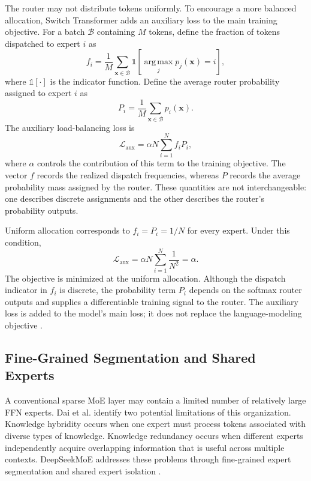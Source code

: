 The router may not distribute tokens uniformly. To encourage a more
balanced allocation, Switch Transformer adds an auxiliary loss to the
main training objective. For a batch \(\mathcal{B}\) containing \(M\)
tokens, define the fraction of tokens dispatched to expert \(i\) as
\begin{equation}
    f_i
    =
    \frac{1}{M}
    \sum_{\mathbf{x}\in\mathcal{B}}
    \mathbb{1}
    \left[
        \operatorname*{arg\,max}_{j}p_j(\mathbf{x})=i
    \right],
    \label{eq:switch-dispatch-fraction}
\end{equation}
where \(\mathbb{1}[\cdot]\) is the indicator function. Define the
average router probability assigned to expert \(i\) as
\begin{equation}
    P_i
    =
    \frac{1}{M}
    \sum_{\mathbf{x}\in\mathcal{B}}p_i(\mathbf{x}).
    \label{eq:switch-router-fraction}
\end{equation}
The auxiliary load-balancing loss is
\begin{equation}
    \mathcal{L}_{\mathrm{aux}}
    =
    \alpha N\sum_{i=1}^{N}f_iP_i,
    \label{eq:switch-load-balancing}
\end{equation}
where \(\alpha\) controls the contribution of this term to the training
objective. The vector \(f\) records the realized dispatch frequencies,
whereas \(P\) records the average probability mass assigned by the
router. These quantities are not interchangeable: one describes
discrete assignments and the other describes the router's probability
outputs.

Uniform allocation corresponds to \(f_i=P_i=1/N\) for every expert.
Under this condition,
\[
    \mathcal{L}_{\mathrm{aux}}
    =
    \alpha N
    \sum_{i=1}^{N}\frac{1}{N^2}
    =
    \alpha.
\]
The objective is minimized at the uniform allocation. Although the
dispatch indicator in \(f_i\) is discrete, the probability term \(P_i\)
depends on the softmax router outputs and supplies a differentiable
training signal to the router. The auxiliary loss is added to the
model's main loss; it does not replace the language-modeling
objective \parencite{fedus2022switch}.

\subsection{Fine-Grained Segmentation and Shared Experts}
\label{subsec:ffn-deepseekmoe}

A conventional sparse MoE layer may contain a limited number of
relatively large FFN experts. Dai et al. identify two potential
limitations of this organization. Knowledge hybridity occurs when
one expert must process tokens associated with diverse types of
knowledge. Knowledge redundancy occurs when different experts
independently acquire overlapping information that is useful across
multiple contexts. DeepSeekMoE addresses these problems through
fine-grained expert segmentation and shared expert isolation
\parencite{dai2024deepseekmoe}.

